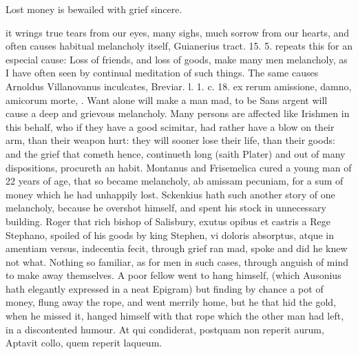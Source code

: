{Lost money is bewailed with grief sincere.

it wrings true tears from our eyes, many sighs, much sorrow from our
hearts, and often causes habitual melancholy itself, Guianerius tract.
15. 5. repeats this for an especial cause: Loss of friends, and
loss of goods, make many men melancholy, as I have often seen by
continual meditation of such things. The same causes Arnoldus
Villanovanus inculcates, Breviar. l. 1. c. 18. ex rerum amissione,
damno, amicorum morte, \etc{}. Want alone will make a man mad, to be Sans
argent will cause a deep and grievous melancholy. Many persons are
affected like  Irishmen in this behalf, who if they have a good
scimitar, had rather have a blow on their arm, than their weapon hurt:
they will sooner lose their life, than their goods: and the grief that
cometh hence, continueth long (saith Plater) and out of many
dispositions, procureth an habit. Montanus and Frisemelica cured
a young man of 22 years of age, that so became melancholy, ab amissam
pecuniam, for a sum of money which he had unhappily lost. Sckenkius
hath such another story of one melancholy, because he overshot himself,
and spent his stock in unnecessary building. Roger that rich
bishop of Salisbury, exutus opibus et castris a Rege Stephano, spoiled
of his goods by king Stephen, vi doloris absorptus, atque in amentiam
versus, indecentia fecit, through grief ran mad, spoke and did he knew
not what. Nothing so familiar, as for men in such cases, through
anguish of mind to make away themselves. A poor fellow went to hang
himself, (which Ausonius hath elegantly expressed in a neat
Epigram) but finding by chance a pot of money, flung away the
rope, and went merrily home, but he that hid the gold, when he missed
it, hanged himself with that rope which the other man had left, in a
discontented humour.
At qui condiderat, postquam non reperit aurum,
Aptavit collo, quem reperit laqueum.

}
